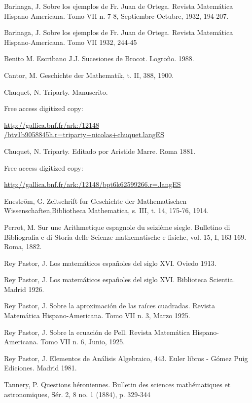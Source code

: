 \documentclass{amsart}
\begin{document}
 \begin{thebibliography}{99}

 Barinaga, J. Sobre los ejemplos de Fr. Juan de Ortega.  Revista Matem\'atica Hispano-Americana. Tomo VII n. 7-8, Septiembre-Octubre, 1932,  194-207.

 Barinaga, J. Sobre los ejemplos de Fr. Juan de Ortega.  Revista Matem\'atica Hispano-Americana. Tomo VII 1932,  244-45

 Benito M. Escribano J.J. Sucesiones de Brocot. Logro\~no. 1988.

  Cantor, M. Geschichte der Mathematik, t. II,  388, 1900.

 Chuquet, N. Triparty. Manuscrito.

Free access digitized copy:

\url{ http://gallica.bnf.fr/ark:/12148
/btv1b9058845h.r=triparty+nicolas+chuquet.langES
}

 Chuquet, N. Triparty. Editado por Aristide Marre. Roma 1881.

 Free access digitized copy:
 
\url{http://gallica.bnf.fr/ark:/12148/bpt6k62599266.r=.langES}

  Enestr\H{o}m, G. Zeitschrift fur Geschichte der Mathematischen Wissenschaften,Bibliotheca Mathematica, s. III, t. 14, 175-76, 1914.

  Perrot, M. Sur une Arithmetique espagnole du seizi\'eme siegle.
 Bulletino di Bibliografia e di Storia delle Scienze mathematische e fisiche, vol. 15, I, 163-169. Roma, 1882.

  Rey Pastor, J. Los matem\'aticos espa\~noles del siglo XVI. Oviedo 1913.

  Rey Pastor, J. Los matem\'aticos espa\~noles del siglo XVI. Biblioteca Scientia. Madrid 1926.

  Rey Pastor, J. Sobre la aproximaci\'on de las ra\'ices cuadradas. Revista Matem\'atica Hispano-Americana. Tomo VII n. 3, Marzo 1925.

  Rey Pastor, J. Sobre la ecuaci\'on de Pell. Revista Matem\'atica Hispano-Americana. Tomo VII n. 6, Junio, 1925.

   Rey Pastor, J. Elementos de An\'alisis Algebraico, 443. Euler libros - G\'omez Puig Ediciones. Madrid 1981.

  Tannery, P.  Questions h\'eroniennes. Bulletin des sciences math\'ematiques et astronomiques, S\'er. 2, 8 no. 1 (1884), p. 329-344


\end{thebibliography}
\end{document}
